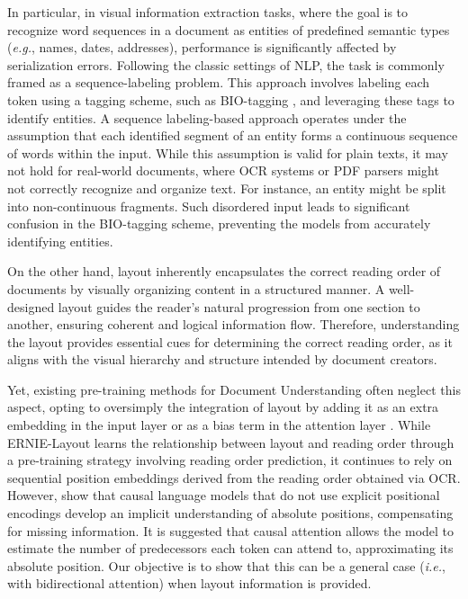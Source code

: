 In particular, in visual information extraction tasks, where the goal is to recognize word sequences in a document as entities of predefined semantic types (\textit{e.g.}, names, dates, addresses), performance is significantly affected by serialization errors. Following the classic settings of \ac{NLP}, the task is commonly framed as a sequence-labeling problem. This approach involves labeling
each token using a tagging scheme, such as BIO-tagging \citep{ramshaw1999text}, and leveraging these tags to identify entities. A sequence labeling-based approach operates under the assumption that each identified segment of an entity forms a continuous sequence of words within the input. While this assumption is valid for plain texts, it may not hold for real-world documents, where \ac{OCR} systems or PDF parsers might not correctly recognize and organize text. For instance, an entity might be split into non-continuous fragments. Such disordered input leads to significant confusion in the BIO-tagging scheme, preventing the models from accurately identifying entities.

On the other hand, layout inherently encapsulates the correct reading order of documents by visually organizing content in a structured manner. A well-designed layout guides the reader's natural progression from one section to another, ensuring coherent and logical information flow. Therefore, understanding the layout provides essential cues for determining the correct reading order, as it aligns with the visual hierarchy and structure intended by document creators. 

Yet, existing pre-training methods for Document Understanding often neglect this aspect, opting to oversimply the integration of layout by adding it as an extra embedding in the input layer \citep{xu2020layoutlm} or as a bias term in the attention layer \citep{xu2020layoutlmv2}. While ERNIE-Layout \citep{peng2022ernie} learns the relationship between layout and reading order through a pre-training strategy involving reading order prediction, it continues to rely on sequential position embeddings derived from the reading order obtained via \ac{OCR}. However, \citet{haviv2022transformer} show that causal language models that do not use explicit positional encodings develop an implicit understanding of absolute positions, compensating for missing information. It is suggested that causal attention allows the model to estimate the number of predecessors each token can attend to, approximating its absolute position. Our objective is to show that this can be a general case (\textit{i.e.}, with bidirectional attention) when layout information is provided.

